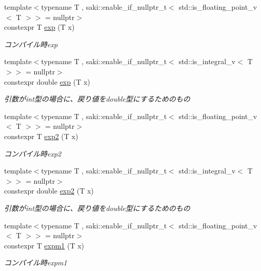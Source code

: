 \begin{DoxyCompactItemize}
{\footnotesize template$<$typename T , saki\+::enable\+\_\+if\+\_\+nullptr\+\_\+t$<$ std\+::is\+\_\+floating\+\_\+point\+\_\+v$<$ T $>$$>$  = nullptr$>$ }\\constexpr T \mbox{\hyperlink{namespacesaki_abc1268e543a60d43b04f1418f5ef3e41}{exp}} (T x)
\begin{DoxyCompactList}\small\item\em コンパイル時exp \end{DoxyCompactList}\item 
{\footnotesize template$<$typename T , saki\+::enable\+\_\+if\+\_\+nullptr\+\_\+t$<$ std\+::is\+\_\+integral\+\_\+v$<$ T $>$$>$  = nullptr$>$ }\\constexpr double \mbox{\hyperlink{namespacesaki_ab7883c6dfd2cf3ae04993f64d98345fc}{exp}} (T x)
\begin{DoxyCompactList}\small\item\em 引数がint型の場合に、戻り値をdouble型にするためのもの \end{DoxyCompactList}\item 
{\footnotesize template$<$typename T , saki\+::enable\+\_\+if\+\_\+nullptr\+\_\+t$<$ std\+::is\+\_\+floating\+\_\+point\+\_\+v$<$ T $>$$>$  = nullptr$>$ }\\constexpr T \mbox{\hyperlink{namespacesaki_a2e2d4ba08357bbab05c97ae261c80343}{exp2}} (T x)
\begin{DoxyCompactList}\small\item\em コンパイル時exp2 \end{DoxyCompactList}\item 
{\footnotesize template$<$typename T , saki\+::enable\+\_\+if\+\_\+nullptr\+\_\+t$<$ std\+::is\+\_\+integral\+\_\+v$<$ T $>$$>$  = nullptr$>$ }\\constexpr double \mbox{\hyperlink{namespacesaki_a35e9ce74a5f65c8d38a4901bf513ac1e}{exp2}} (T x)
\begin{DoxyCompactList}\small\item\em 引数がint型の場合に、戻り値をdouble型にするためのもの \end{DoxyCompactList}\item 
{\footnotesize template$<$typename T , saki\+::enable\+\_\+if\+\_\+nullptr\+\_\+t$<$ std\+::is\+\_\+floating\+\_\+point\+\_\+v$<$ T $>$$>$  = nullptr$>$ }\\constexpr T \mbox{\hyperlink{namespacesaki_aabb63a6251c75f6f1e76a58f5438de69}{expm1}} (T x)
\begin{DoxyCompactList}\small\item\em コンパイル時expm1 \end{DoxyCompactList}\item 

\end{DoxyCompactItemize}
